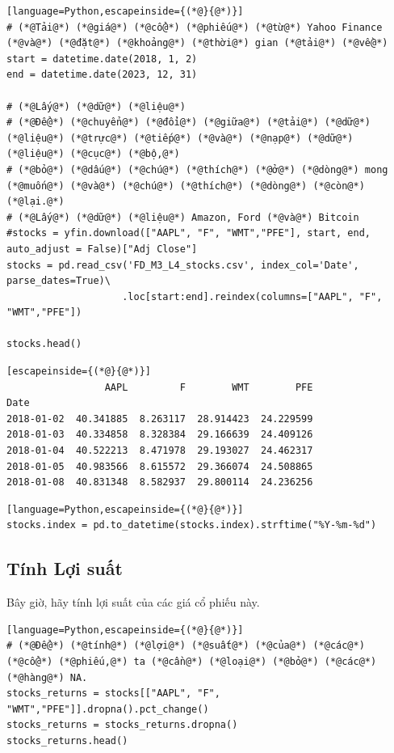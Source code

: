 \begin{lstlisting}[language=Python,escapeinside={(*@}{@*)}]
# (*@Tải@*) (*@giá@*) (*@cổ@*) (*@phiếu@*) (*@từ@*) Yahoo Finance (*@và@*) (*@đặt@*) (*@khoảng@*) (*@thời@*) gian (*@tải@*) (*@về@*)
start = datetime.date(2018, 1, 2)
end = datetime.date(2023, 12, 31)

# (*@Lấy@*) (*@dữ@*) (*@liệu@*)
# (*@Để@*) (*@chuyển@*) (*@đổi@*) (*@giữa@*) (*@tải@*) (*@dữ@*) (*@liệu@*) (*@trực@*) (*@tiếp@*) (*@và@*) (*@nạp@*) (*@dữ@*) (*@liệu@*) (*@cục@*) (*@bộ,@*) 
# (*@bỏ@*) (*@dấu@*) (*@chú@*) (*@thích@*) (*@ở@*) (*@dòng@*) mong (*@muốn@*) (*@và@*) (*@chú@*) (*@thích@*) (*@dòng@*) (*@còn@*) (*@lại.@*)
# (*@Lấy@*) (*@dữ@*) (*@liệu@*) Amazon, Ford (*@và@*) Bitcoin
#stocks = yfin.download(["AAPL", "F", "WMT","PFE"], start, end, auto_adjust = False)["Adj Close"]
stocks = pd.read_csv('FD_M3_L4_stocks.csv', index_col='Date', parse_dates=True)\
                    .loc[start:end].reindex(columns=["AAPL", "F", "WMT","PFE"])

stocks.head()
\end{lstlisting}

\begin{lstlisting}[escapeinside={(*@}{@*)}]
                 AAPL         F        WMT        PFE
Date                                                 
2018-01-02  40.341885  8.263117  28.914423  24.229599
2018-01-03  40.334858  8.328384  29.166639  24.409126
2018-01-04  40.522213  8.471978  29.193027  24.462317
2018-01-05  40.983566  8.615572  29.366074  24.508865
2018-01-08  40.831348  8.582937  29.800114  24.236256
\end{lstlisting}

\begin{lstlisting}[language=Python,escapeinside={(*@}{@*)}]
stocks.index = pd.to_datetime(stocks.index).strftime("%Y-%m-%d")
\end{lstlisting}

\subsection{Tính Lợi suất}

Bây giờ, hãy tính lợi suất của các giá cổ phiếu này.

\begin{lstlisting}[language=Python,escapeinside={(*@}{@*)}]
# (*@Để@*) (*@tính@*) (*@lợi@*) (*@suất@*) (*@của@*) (*@các@*) (*@cổ@*) (*@phiếu,@*) ta (*@cần@*) (*@loại@*) (*@bỏ@*) (*@các@*) (*@hàng@*) NA.
stocks_returns = stocks[["AAPL", "F", "WMT","PFE"]].dropna().pct_change()
stocks_returns = stocks_returns.dropna()
stocks_returns.head()
\end{lstlisting}

